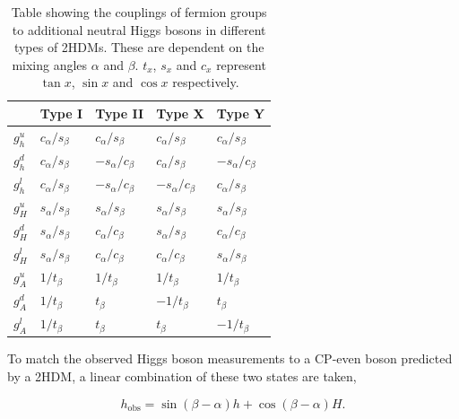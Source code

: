 \begin{table}[H]
    \centering
    \begin{tabular}{|x{1.0cm}|x{2.0cm}x{2.0cm}x{2.0cm}x{2.0cm}|}
    		\hline
    	 	& Type I & Type II & Type X & Type Y \\
    	 	\hline
    	 	\hline
    	 	$g_{h}^{u}$ & $c_{\alpha}/s_{\beta}$ & $c_{\alpha}/s_{\beta}$  & $c_{\alpha}/s_{\beta}$  & $c_{\alpha}/s_{\beta}$  \\ 
    	 	$g_{h}^{d}$ & $c_{\alpha}/s_{\beta}$ & $-s_{\alpha}/c_{\beta}$ & $c_{\alpha}/s_{\beta}$  & $-s_{\alpha}/c_{\beta}$ \\
    	 	$g_{h}^{l}$ & $c_{\alpha}/s_{\beta}$ & $-s_{\alpha}/c_{\beta}$ & $-s_{\alpha}/c_{\beta}$ & $c_{\alpha}/s_{\beta}$  \\
    	 	\hline
    	 	$g_{H}^{u}$ & $s_{\alpha}/s_{\beta}$ & $s_{\alpha}/s_{\beta}$ & $s_{\alpha}/s_{\beta}$ & $s_{\alpha}/s_{\beta}$ \\
    	 	$g_{H}^{d}$ & $s_{\alpha}/s_{\beta}$ & $c_{\alpha}/c_{\beta}$ & $s_{\alpha}/s_{\beta}$ & $c_{\alpha}/c_{\beta}$ \\
    	 	$g_{H}^{l}$ & $s_{\alpha}/s_{\beta}$ & $c_{\alpha}/c_{\beta}$ & $c_{\alpha}/c_{\beta}$ & $s_{\alpha}/s_{\beta}$ \\
    	 	\hline
    	 	$g_{A}^{u}$ & $1/t_{\beta}$ & $1/t_{\beta}$ & $1/t_{\beta}$  & $1/t_{\beta}$ \\
    	 	$g_{A}^{d}$ & $1/t_{\beta}$ & $t_{\beta}$   & $-1/t_{\beta}$ & $t_{\beta}$ \\
    	 	$g_{A}^{l}$ & $1/t_{\beta}$ & $t_{\beta}$   & $t_{\beta}$    & $-1/t_{\beta}$ \\
        \hline
    \end{tabular}
    \caption[The couplings of fermions groups to additional Higgs bosons in the 2HDMs.]{Table showing the couplings of fermion groups to additional neutral Higgs bosons in different types of 2HDMs. These are dependent on the mixing angles $\alpha$ and $\beta$. $t_{x}$, $s_{x}$ and $c_{x}$ represent $\tan x$, $\sin x$ and $\cos x$ respectively.}
    \label{tab:2hdm_couplings}
\end{table}

To match the observed Higgs boson measurements to a \ac{CP}-even boson predicted by a \ac{2HDM}, a linear combination of these two states are taken,

\begin{equation}
h_{\text{obs}} = \sin(\beta-\alpha) h + \cos(\beta-\alpha) H.
\end{equation}

